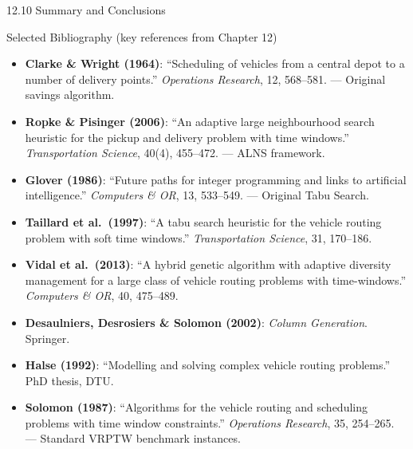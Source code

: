 \documentclass[aspectratio=169,10pt]{beamer}
\begin{document}
\begin{frame}[allowframebreaks]{12.10 \; Summary and Conclusions}
  \begin{block}{Selected Bibliography (key references from Chapter 12)}
    \footnotesize
    \begin{itemize}
      \item \textbf{Clarke \& Wright (1964)}: ``Scheduling of vehicles from
            a central depot to a number of delivery points.''
            \emph{Operations Research}, 12, 568--581.
            --- Original savings algorithm.
      \item \textbf{Ropke \& Pisinger (2006)}: ``An adaptive large neighbourhood
            search heuristic for the pickup and delivery problem with time windows.''
            \emph{Transportation Science}, 40(4), 455--472.
            --- ALNS framework.
      \item \textbf{Glover (1986)}: ``Future paths for integer programming and
            links to artificial intelligence.'' \emph{Computers \& OR}, 13, 533--549.
            --- Original Tabu Search.
      \item \textbf{Taillard et al.\ (1997)}: ``A tabu search heuristic for the
            vehicle routing problem with soft time windows.''
            \emph{Transportation Science}, 31, 170--186.
      \item \textbf{Vidal et al.\ (2013)}: ``A hybrid genetic algorithm with
            adaptive diversity management for a large class of vehicle routing
            problems with time-windows.''
            \emph{Computers \& OR}, 40, 475--489.
      \item \textbf{Desaulniers, Desrosiers \& Solomon (2002)}:
            \emph{Column Generation}. Springer.
      \item \textbf{Halse (1992)}: ``Modelling and solving complex vehicle
            routing problems.'' PhD thesis, DTU.
      \item \textbf{Solomon (1987)}: ``Algorithms for the vehicle routing and
            scheduling problems with time window constraints.''
            \emph{Operations Research}, 35, 254--265.
            --- Standard VRPTW benchmark instances.
    \end{itemize}
  \end{block}
\end{frame}
\end{document}
